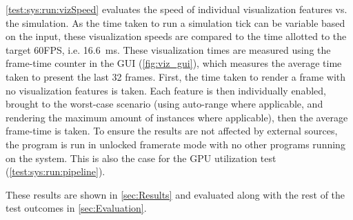 

\cref{test:sys:run:vizSpeed} evaluates the speed of individual visualization features vs. the simulation.
As the time taken to run a simulation tick can be variable based on the input, these visualization speeds are compared to the time allotted to the target 60FPS, i.e. \SI{16.6}{\milli\second}.
These visualization times are measured using the frame-time counter in the GUI (\cref{fig:viz_gui}), which measures the average time taken to present the last 32 frames.
First, the time taken to render a frame with no visualization features is taken.
Each feature is then individually enabled, brought to the worst-case scenario (using auto-range where applicable, and rendering the maximum amount of instances where applicable), then the average frame-time is taken.
To ensure the results are not affected by external sources, the program is run in unlocked framerate mode with no other programs running on the system.
This is also the case for the GPU utilization test (\cref{test:sys:run:pipeline}).

These results are shown in \cref{sec:Results} and evaluated along with the rest of the test outcomes in \cref{sec:Evaluation}.